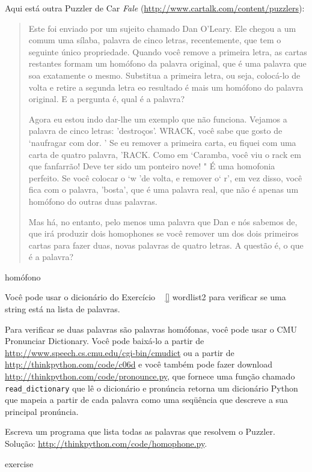 \documentclass[10pt]{book}
\begin{document}
\begin{exercise}
\begin{v erbatim}
\begin{}
Aqui está outra Puzzler de {Car \em
Fale} (\url{http://www.cartalk.com/content/puzzlers}):

\begin{quote}
Este foi enviado por um sujeito chamado Dan O'Leary. Ele chegou a um comum
uma sílaba, palavra de cinco letras, recentemente, que tem o seguinte único
propriedade. Quando você remove a primeira letra, as cartas restantes formam
um homófono da palavra original, que é uma palavra que soa exatamente
o mesmo. Substitua a primeira letra, ou seja, colocá-lo de volta e retire
a segunda letra eo resultado é mais um homófono do
palavra original. E a pergunta é, qual é a palavra?

Agora eu estou indo dar-lhe um exemplo que não funciona. Vejamos
a palavra de cinco letras: 'destroços'. WRACK, você sabe que gosto de `naufragar com
dor. ' Se eu remover a primeira carta, eu fiquei com uma carta de quatro
palavra, 'RACK. Como em `Caramba, você viu o rack em que fanfarrão!
Deve ter sido um ponteiro nove! " É uma homofonia perfeito. Se você
colocar o `w 'de volta, e remover o` r', em vez disso, você fica com o
palavra, 'bosta', que é uma palavra real, que não é apenas um homófono do
outras duas palavras.

Mas há, no entanto, pelo menos uma palavra que Dan e nós sabemos de,
que irá produzir dois homophones se você remover um dos dois primeiros
cartas para fazer duas, novas palavras de quatro letras. A questão é, o que é
a palavra?
\end{quote}
\index{} homófono

Você pode usar o dicionário do Exercício ~ \ref {} wordlist2 para verificar
se uma string está na lista de palavras.

Para verificar se duas palavras são palavras homófonas, você pode usar o CMU
Pronunciar Dictionary. Você pode baixá-lo a partir de
\url{http://www.speech.cs.cmu.edu/cgi-bin/cmudict} ou a partir de
\url{http://thinkpython.com/code/c06d} e você também pode fazer download
\url{http://thinkpython.com/code/pronounce.py}, que fornece uma função
chamado \verb "read_dictionary" que lê o dicionário e pronúncia
retorna um dicionário Python que mapeia a partir de cada palavra como uma seqüência que
descreve a sua principal pronúncia.

Escreva um programa que lista todas as palavras que resolvem o Puzzler.
Solução: \url{http://thinkpython.com/code/homophone.py}.

\end{} exercise




\end{v erbatim}
\end{exercise}
\end{document}

